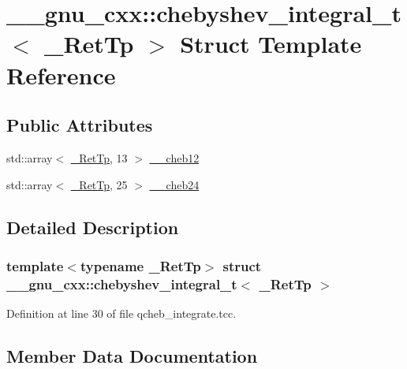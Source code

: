 \hypertarget{struct____gnu__cxx_1_1chebyshev__integral__t}{}\section{\+\_\+\+\_\+gnu\+\_\+cxx\+:\+:chebyshev\+\_\+integral\+\_\+t$<$ \+\_\+\+Ret\+Tp $>$ Struct Template Reference}
\label{struct____gnu__cxx_1_1chebyshev__integral__t}
\subsection*{Public Attributes}
\begin{DoxyCompactItemize}
\item 
std\+::array$<$ \hyperlink{namespace____gnu__cxx_a886e03ece3d53ff7fa6c098a40f93fa5}{\+\_\+\+Ret\+Tp}, 13 $>$ \hyperlink{struct____gnu__cxx_1_1chebyshev__integral__t_abe2450422eb000b28d5446df6bb08c43}{\+\_\+\+\_\+cheb12}
\item 
std\+::array$<$ \hyperlink{namespace____gnu__cxx_a886e03ece3d53ff7fa6c098a40f93fa5}{\+\_\+\+Ret\+Tp}, 25 $>$ \hyperlink{struct____gnu__cxx_1_1chebyshev__integral__t_ad1f7bac86ebf50a99544f265e7b43366}{\+\_\+\+\_\+cheb24}
\end{DoxyCompactItemize}


\subsection{Detailed Description}
\subsubsection*{template$<$typename \+\_\+\+Ret\+Tp$>$\newline
struct \+\_\+\+\_\+gnu\+\_\+cxx\+::chebyshev\+\_\+integral\+\_\+t$<$ \+\_\+\+Ret\+Tp $>$}



Definition at line 30 of file qcheb\+\_\+integrate.\+tcc.



\subsection{Member Data Documentation}
\mbox{\label{struct____gnu__cxx_1_1chebyshev__integral__t_abe2450422eb000b28d5446df6bb08c43}} 
